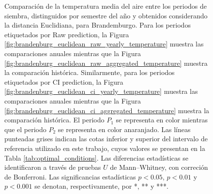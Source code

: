 \begin{figure}[htbp]
	\caption{
		Comparación de la temperatura media del aire entre los periodos de siembra, distinguidos por semestre del año y obtenidos considerando la distancia Euclidiana, para Brandemburgo. Para los periodos etiquetados por Raw prediction, la Figura \ref{fig:brandenburg_euclidean_raw_yearly_temperature} muestra las comparaciones anuales mientras que la Figura \ref{fig:brandenburg_euclidean_raw_aggregated_temperature} muestra la comparación histórica. Similarmente, para los periodos etiquetados por CI prediction, la Figura \ref{fig:brandenburg_euclidean_ci_yearly_temperature} muestra las comparaciones anuales mientras que la Figura \ref{fig:brandenburg_euclidean_ci_aggregated_temperature} muestra la comparación histórica. El periodo $P_1$ se representa en color mientras que el periodo $P_2$ se representa en color anaranjado. Las líneas punteadas grises indican las cotas inferior y superior del intervalo de referencia utilizado en este trabajo, cuyos valores se presentan en la Tabla \ref{tab:optimal_conditions}. Las diferencias estadísticas se identificaron a través de pruebas $U$ de Mann--Whitney, con correción de Bonferroni. Las significancias estadísticas $p<0.05$, $p<0.01$ y $p<0.001$ se denotan, respectivamente, por *, ** y ***.
	}
	\label{fig:brandenburg_euclidean_average_temperature}
	
	
\end{figure}



